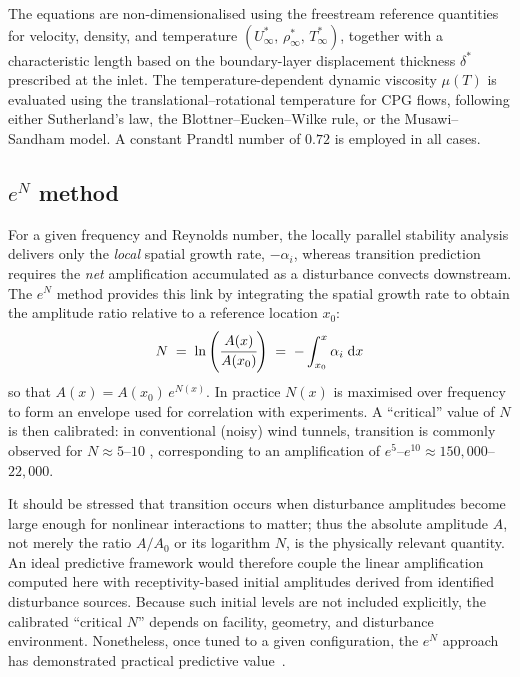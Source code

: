 The equations are non-dimensionalised using the freestream reference quantities for velocity, density, and temperature $(U_\infty^*,\,\rho_\infty^*,\,T_\infty^*)$, together with a characteristic length based on the boundary-layer displacement thickness $\delta^{*}$ prescribed at the inlet. The temperature-dependent dynamic viscosity $\mu(T)$ is evaluated using the translational--rotational temperature for \gls{CPG} flows, following either Sutherland's law, the Blottner--Eucken--Wilke rule, or the Musawi--Sandham model. A constant Prandtl number of $0.72$ is employed in all cases.

\subsection{$e^N$ method}

For a given frequency and Reynolds number, the locally parallel stability analysis delivers only the \emph{local} spatial growth rate, $- \alpha_i$, whereas transition prediction requires the \emph{net} amplification accumulated as a disturbance convects downstream. The $e^N$ method \citep{SmithGamberoni1956,VanIngen1956} provides this link by integrating the spatial growth rate to obtain the amplitude ratio relative to a reference location $x_0$: %
\begin{equation}
    N \;=\; \ln{ \left( \cfrac{A(x)}{A(x_0)} \right )} \;=\; - \int_{x_0}^{x} \alpha_i \; \mathrm{d} x
\end{equation}
so that $A(x)=A(x_0)\,e^{N(x)}$. In practice $N(x)$ is maximised over frequency to form an envelope used for correlation with experiments. A ``critical'' value of $N$ is then calibrated: in conventional (noisy) wind tunnels, transition is commonly observed for $N \approx 5$--$10$ \citep{Schneider2015}, corresponding to an amplification of $e^{5}$--$e^{10}\!\approx\!150{,}000$--$22{,}000$.

It should be stressed that transition occurs when disturbance amplitudes become large enough for nonlinear interactions to matter; thus the absolute amplitude $A$, not merely the ratio $A/A_0$ or its logarithm $N$, is the physically relevant quantity. An ideal predictive framework would therefore couple the linear amplification computed here with receptivity-based initial amplitudes derived from identified disturbance sources. Because such initial levels are not included explicitly, the calibrated ``critical $N$'' depends on facility, geometry, and disturbance environment. Nonetheless, once tuned to a given configuration, the $e^N$ approach has demonstrated practical predictive value~\citep{Fedorov2011}.

